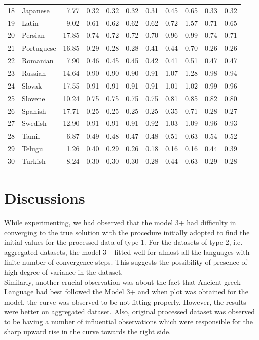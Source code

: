 \documentclass[a4paper]{article}
\begin{document}
\begin{table}
\begin{tabular}{rlrrrrrrrrr}
		18 & Japanese & 7.77 & 0.32 & 0.32 & 0.32 & 0.31 & 0.45 & 0.65 & 0.33 & 0.32 \\ 
		19 & Latin & 9.02 & 0.61 & 0.62 & 0.62 & 0.62 & 0.72 & 1.57 & 0.71 & 0.65 \\ 
		20 & Persian & 17.85 & 0.74 & 0.72 & 0.72 & 0.70 & 0.96 & 0.99 & 0.74 & 0.71 \\ 
		21 & Portuguese & 16.85 & 0.29 & 0.28 & 0.28 & 0.41 & 0.44 & 0.70 & 0.26 & 0.26 \\ 
		22 & Romanian & 7.90 & 0.46 & 0.45 & 0.45 & 0.42 & 0.41 & 0.51 & 0.47 & 0.47 \\ 
		23 & Russian & 14.64 & 0.90 & 0.90 & 0.90 & 0.91 & 1.07 & 1.28 & 0.98 & 0.94 \\ 
		24 & Slovak & 17.55 & 0.91 & 0.91 & 0.91 & 0.91 & 1.01 & 1.02 & 0.99 & 0.96 \\ 
		25 & Slovene & 10.24 & 0.75 & 0.75 & 0.75 & 0.75 & 0.81 & 0.85 & 0.82 & 0.80 \\ 
		26 & Spanish & 17.71 & 0.25 & 0.25 & 0.25 & 0.25 & 0.35 & 0.71 & 0.28 & 0.27 \\ 
		27 & Swedish & 12.90 & 0.91 & 0.91 & 0.91 & 0.92 & 1.03 & 1.09 & 0.96 & 0.93 \\ 
		28 & Tamil & 6.87 & 0.49 & 0.48 & 0.47 & 0.48 & 0.51 & 0.63 & 0.54 & 0.52 \\ 
		29 & Telugu & 1.26 & 0.40 & 0.29 & 0.26 & 0.18 & 0.16 & 0.16 & 0.44 & 0.39 \\ 
		30 & Turkish & 8.24 & 0.30 & 0.30 & 0.30 & 0.28 & 0.44 & 0.63 & 0.29 & 0.28 \\ 
		\hline
	\end{tabular}
\end{table}
\pagestyle{plain}






\section[]{Discussions}
While experimenting, we had observed that the model 3$+$ had difficulty in converging to the true solution with the procedure initially adopted to find the initial values for the processed data of type 1. For the datasets of type 2, i.e. aggregated datasets, the model 3$+$ fitted well for almost all the languages with finite number of convergence steps. This suggests the possibility of presence of high degree of variance in the dataset.\\
Similarly, another crucial observation was about the fact that Ancient greek Language had best followed the Model 3+ and when plot was obtained for the model, the curve was observed to be not fitting properly. However, the results were better on aggregated dataset. Also, original processed dataset was observed to be having a number of influential observations which were responsible for the sharp upward rise in the curve towards the right side.
 
\end{document}
